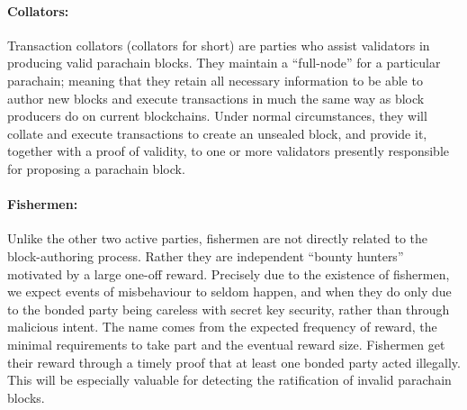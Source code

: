 \paragraph{Collators: }\label{par:collators} Transaction collators (collators for short) are parties who assist validators in producing valid parachain blocks. They maintain a “full-node” for a particular parachain; meaning that they retain all necessary information to be able to author new blocks and execute transactions in much the same way as block producers do on current blockchains. Under normal circumstances, they will collate and execute transactions to create an unsealed block, and provide it, together with a proof of validity, to one or more validators presently responsible for proposing a parachain block.


\paragraph{Fishermen:} \label{par:fishermen} Unlike the other two active parties, fishermen are not directly related to the block-authoring process. Rather they are independent “bounty hunters” motivated by a large one-off reward. Precisely due to the existence of fishermen, we expect events of misbehaviour to seldom happen, and when they do only due to the bonded party being careless with secret key security, rather than through malicious intent. The name comes from the expected frequency of reward, the minimal requirements to take part and the eventual reward size.
Fishermen get their reward through a timely proof that at least one bonded party acted illegally. This will be especially valuable for detecting the ratification of invalid parachain blocks.

